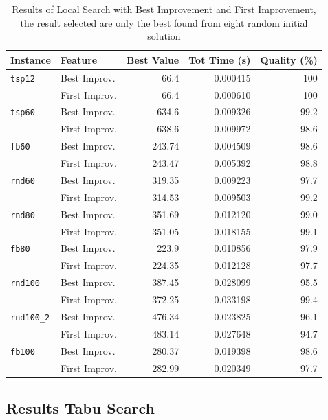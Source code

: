 	\begin{table}[H]
		\centering
		\begin{tabular}{llrrr}
			\toprule
			\textbf{Instance} & \textbf{Feature} & \textbf{Best Value} & \textbf{Tot Time (s)} & \textbf{Quality (\%)} \\
			\midrule
			\verb|tsp12| & Best Improv. & 66.4 & 0.000415 & 100 \\
							& First Improv. & 66.4 & 0.000610 & 100 \\
			\midrule
			\verb|tsp60| 	& Best Improv. & 634.6 & 0.009326 & 99.2 \\
							& First Improv. & 638.6 & 0.009972 & 98.6 \\
			\midrule
			\verb|fb60|		& Best Improv. & 243.74 & 0.004509 & 98.6 \\
							& First Improv. & 243.47 & 0.005392 & 98.8 \\ 
			\midrule
			\verb|rnd60| 	& Best Improv. & 319.35 & 0.009223 & 97.7 \\
							& First Improv. & 314.53 & 0.009503 & 99.2 \\
			\midrule
			\verb|rnd80| 	& Best Improv. & 351.69 & 0.012120 & 99.0 \\
							& First Improv. & 351.05 & 0.018155 & 99.1 \\
			\midrule
			\verb|fb80| 	& Best Improv. & 223.9 & 0.010856 & 97.9 \\
							& First Improv. & 224.35 & 0.012128 & 97.7 \\
			\midrule
			\verb|rnd100| 	& Best Improv. & 387.45 & 0.028099 & 95.5 \\
							& First Improv. & 372.25 & 0.033198 & 99.4 \\
			\midrule
			\verb|rnd100_2| & Best Improv. & 476.34 & 0.023825 & 96.1 \\
							& First Improv. & 483.14 & 0.027648 & 94.7 \\
			\midrule
			\verb|fb100| & Best Improv. & 280.37 & 0.019398 & 98.6 \\
						& First Improv. & 282.99 & 0.020349 & 97.7 \\
			\bottomrule
		\end{tabular}
		\caption{\label{tab:LS-BestStrategyResult} Results of Local Search with Best Improvement and First Improvement, the result selected are only the best found from eight random initial solution}
	\end{table}
	
\newpage
\subsection{Results Tabu Search}
	
